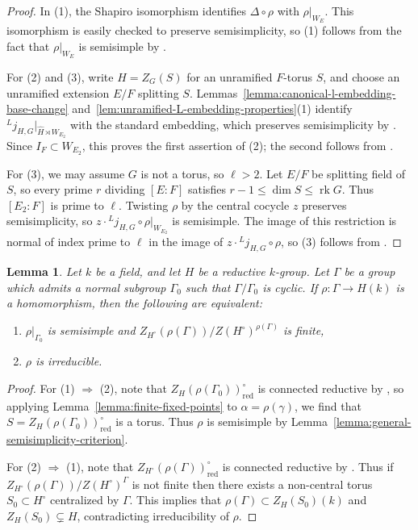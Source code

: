 \documentclass[reqno]{amsart}
\numberwithin{equation}{subsection}
\newcommand{\wh}[1]{\widehat{#1}}
\newcommand{\ld}{{}^L}
\DeclareMathOperator{\rk}{rk}
\newtheorem{lemma}[thm]{Lemma}
\theoremstyle{remark}
\numberwithin{equation}{subsection}
\numberwithin{figure}{subsection}
\begin{document}
\begin{proof}
In (1), the Shapiro isomorphism identifies $\Delta \circ \rho$ with $\rho|_{W_E}$. This isomorphism is easily checked to preserve semisimplicity, so (1) follows from the fact that $\rho|_{W_E}$ is semisimple by \cite[Theorem 3.10, \S 6.3]{BMR05}.

For (2) and (3), write $H=Z_G(S)$ for an unramified $F$-torus $S$, and choose an unramified extension $E/F$ splitting $S$. Lemmas~\ref{lemma:canonical-l-embedding-base-change} and~\ref{lem:unramified-L-embedding-properties}(1) identify $\ld j_{H,G}|_{\wh H\rtimes W_{E_2}}$ with the standard embedding, which preserves semisimplicity by \cite[Corollary 2.10]{BMR08}. Since $I_F\subset W_{E_2}$, this proves the first assertion of (2); the second follows from \cite[Theorem 3.10, \S 6.3]{BMR05}.

For (3), we may assume $G$ is not a torus, so $\ell > 2$. Let $E/F$ be splitting field of $S$, so every prime $r$ dividing $[E:F]$ satisfies $r-1\leq\dim S\leq\rk G$. Thus $[E_2:F]$ is prime to $\ell$. Twisting $\rho$ by the central cocycle $z$ preserves semisimplicity, so $z \cdot \ld j_{H,G} \circ \rho|_{W_{E_2}}$ is semisimple. The image of this restriction is normal of index prime to $\ell$ in the image of $z \cdot \ld j_{H,G} \circ \rho$, so (3) follows from \cite[Corollary 3.7(ii)]{BMR08}.
\end{proof}

\begin{lemma}\label{lemma:general-irreducibility-criterion}
Let $k$ be a field, and let $H$ be a reductive $k$-group. Let $\Gamma$ be a group which admits a normal subgroup $\Gamma_0$ such that $\Gamma/\Gamma_0$ is cyclic. If $\rho\colon \Gamma \to H(k)$ is a homomorphism, then the following are equivalent:
\begin{enumerate}
    \item $\rho|_{\Gamma_0}$ is semisimple and $Z_{H^\circ}(\rho(\Gamma))/Z(H^\circ)^{\rho(\Gamma)}$ is finite,
    \item $\rho$ is irreducible.
\end{enumerate}
\end{lemma}

\begin{proof}
For (1) $\Rightarrow$ (2), note that $Z_H(\rho(\Gamma_0))^\circ_{\mathrm{red}}$ is connected reductive by \cite[Proposition 3.12]{BMR05}, so applying Lemma~\ref{lemma:finite-fixed-points} to $\alpha = \rho(\gamma)$, we find that $S = Z_H(\rho(\Gamma_0))^\circ_{\mathrm{red}}$ is a torus. Thus $\rho$ is semisimple by Lemma~\ref{lemma:general-semisimplicity-criterion}.

For (2) $\Rightarrow$ (1), note that $Z_{H^\circ}(\rho(\Gamma))^\circ_{\mathrm{red}}$ is connected reductive by \cite[Proposition 3.12]{BMR05}. Thus if $Z_{H^\circ}(\rho(\Gamma))/Z(H^\circ)^\Gamma$ is not finite then there exists a non-central torus $S_0 \subset H^\circ$ centralized by $\Gamma$. This implies that $\rho(\Gamma) \subset Z_H(S_0)(k)$ and $Z_H(S_0) \subsetneq H$, contradicting irreducibility of $\rho$.
\end{proof}
\end{document}
